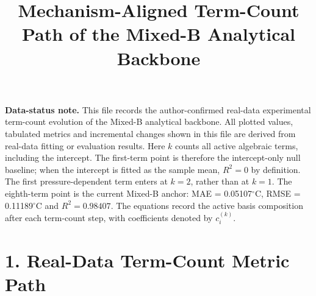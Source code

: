 \documentclass[10pt]{article}
\title{\vspace{-1.8em}Mechanism-Aligned Term-Count Path of the Mixed-B Analytical Backbone}
\author{}
\date{}
\begin{document}
\maketitle
\vspace{-2.8em}

\noindent\textcolor{noteRed}{\textbf{Data-status note.}}
This file records the author-confirmed real-data experimental term-count evolution of the Mixed-B analytical backbone.
All plotted values, tabulated metrics and incremental changes shown in this file are derived from real-data fitting or evaluation results.
Here $k$ counts all active algebraic terms, including the intercept.
The first-term point is therefore the intercept-only null baseline; when the intercept is fitted as the sample mean, $R^2=0$ by definition.
The first pressure-dependent term enters at $k=2$, rather than at $k=1$.
The eighth-term point is the current Mixed-B anchor: MAE = 0.05107$^\circ$C, RMSE = 0.11189$^\circ$C and $R^2=0.98407$.
The equations record the active basis composition after each term-count step, with coefficients denoted by $c_i^{(k)}$.

\section*{1. Real-Data Term-Count Metric Path}
\end{document}
